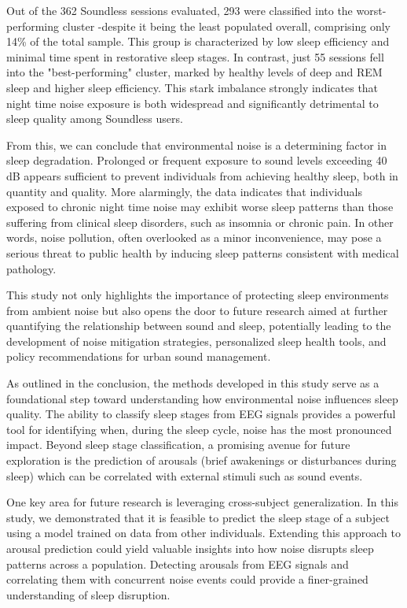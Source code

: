 Out of the 362 Soundless sessions evaluated, 293 were classified into the worst-performing cluster -despite it being the least populated overall, comprising only 14\% of the total sample. This group is characterized by low sleep efficiency and minimal time spent in restorative sleep stages. In contrast, just 55 sessions fell into the "best-performing" cluster, marked by healthy levels of deep and REM sleep and higher sleep efficiency. This stark imbalance strongly indicates that night time noise exposure is both widespread and significantly detrimental to sleep quality among Soundless users.

From this, we can conclude that environmental noise is a determining factor in sleep degradation. Prolonged or frequent exposure to sound levels exceeding 40 dB appears sufficient to prevent individuals from achieving healthy sleep, both in quantity and quality. More alarmingly, the data indicates that individuals exposed to chronic night time noise may exhibit worse sleep patterns than those suffering from clinical sleep disorders, such as insomnia or chronic pain. In other words, noise pollution, often overlooked as a minor inconvenience, may pose a serious threat to public health by inducing sleep patterns consistent with medical pathology.

This study not only highlights the importance of protecting sleep environments from ambient noise but also opens the door to future research aimed at further quantifying the relationship between sound and sleep, potentially leading to the development of noise mitigation strategies, personalized sleep health tools, and policy recommendations for urban sound management.

As outlined in the conclusion, the methods developed in this study serve as a foundational step toward understanding how environmental noise influences sleep quality. The ability to classify sleep stages from EEG signals provides a powerful tool for identifying when, during the sleep cycle, noise has the most pronounced impact. Beyond sleep stage classification, a promising avenue for future exploration is the prediction of arousals (brief awakenings or disturbances during sleep) which can be correlated with external stimuli such as sound events.

One key area for future research is leveraging cross-subject generalization. In this study, we demonstrated that it is feasible to predict the sleep stage of a subject using a model trained on data from other individuals. Extending this approach to arousal prediction could yield valuable insights into how noise disrupts sleep patterns across a population. Detecting arousals from EEG signals and correlating them with concurrent noise events could provide a finer-grained understanding of sleep disruption.


